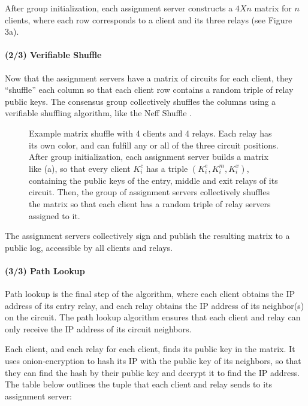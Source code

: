 After group initialization, each assignment server constructs a $4 X n$ matrix for $n$ clients, where each row corresponds to a client and its three relays (see Figure 3a). 

\paragraph{(2/3) Verifiable Shuffle}
Now that the assignment servers have a matrix of circuits for each client, they
``shuffle'' each column so that each client row contains a random triple of
relay public keys. The consensus group collectively shuffles the columns using
a verifiable shuffling algorithm, like the Neff Shuffle \cite{neff2001verifiable}.

\begin{figure}[htb]
\centering
\hspace{\fill}%
\hspace{\fill}%
\hspace*{\fill}%
\caption[bla]{Example matrix shuffle with 4 clients and 4 relays. Each relay
has its own color, and can fulfill any or all of the three circuit positions.
After group initialization, each assignment server builds a matrix like (a), 
so that  every client $K^c_i$ has a triple $(K^e_i, K^m_i, K^x_i)$, containing the public keys of the entry, middle and exit relays of its circuit. Then, the
group of assignment servers collectively shuffles the matrix so that each client has a random triple of relay servers assigned to it.}
\end{figure}

The assignment servers collectively sign and publish the resulting matrix to a public log, accessible by all clients and relays. 

\paragraph{(3/3) Path Lookup}
Path lookup is the final step of the algorithm, where each client obtains the
IP address of its entry relay, and each relay obtains the IP address of its
neighbor(s) on the circuit. The path lookup algorithm ensures that each client
and relay can only receive the IP address of its circuit neighbors.

Each client, and each relay for each client, finds its public key in the matrix.
It uses onion-encryption to hash its IP with the public key of its neighbors,
so that they can find the hash by their public key and decrypt it to find the IP address. The table below outlines the tuple that each client and relay sends to
its assignment server:

